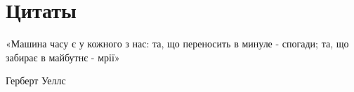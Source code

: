  
 
 

\section{Цитаты}

«Машина часу є у кожного з нас: та, що переносить в минуле - спогади; та, що
забирає в майбутнє - мрії»

Герберт Уеллс
